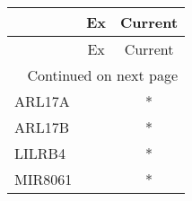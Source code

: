 \begin{longtable}{lcc}
\toprule
{} & Ex & Current \\
\midrule
\endfirsthead

\toprule
{} & Ex & Current \\
\midrule
\endhead
\midrule
\multicolumn{3}{r}{{Continued on next page}} \\
\midrule
\endfoot

\bottomrule
\endlastfoot
ARL17A  &    &       * \\
ARL17B  &    &       * \\
LILRB4  &    &       * \\
MIR8061 &    &       * \\
\end{longtable}
